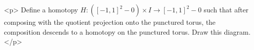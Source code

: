 <p>
    Define a homotopy $H : ([-1,1]^2 - 0) \times I \to [-1,1]^2 - 0$ such that after composing with the
    quotient projection onto the punctured torus, the composition descends to a homotopy on the punctured torus.
    Draw this diagram.
</p>